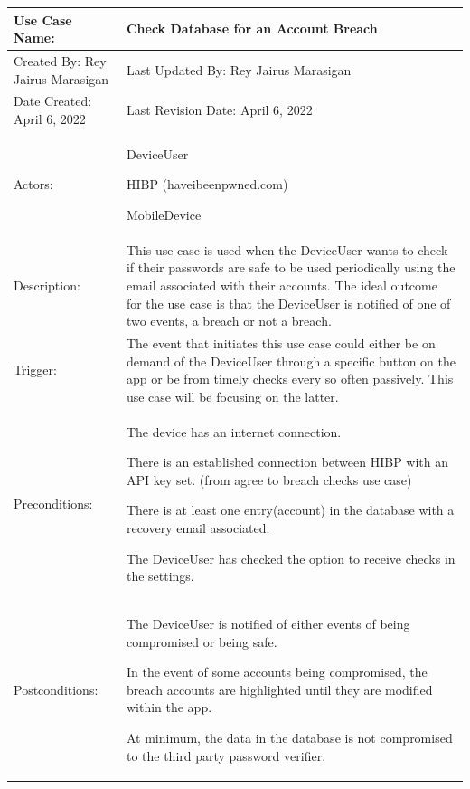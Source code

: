 \documentclass[stu]{apa7}
\newcommand{\nextitem}{\par\hspace*{\labelsep}\textbullet\hspace*{\labelsep}}
\begin{document}
{{{\begin{xltabular}{\textwidth}{|l|X|}
  Use Case Name: & Check Database for an Account Breach\\ \hline

  Created By: Rey Jairus Marasigan & Last Updated By: Rey Jairus Marasigan \\ \hline

  Date Created: April 6, 2022 & Last Revision Date: April 6, 2022 \\ \hline

  Actors: & \nextitem DeviceUser \nextitem HIBP (haveibeenpwned.com) \nextitem MobileDevice \\ \hline

  Description: & This use case is used when the DeviceUser wants to check if their passwords are safe to be used periodically using the email associated with their accounts. The ideal outcome for the use case is that the DeviceUser is notified of one of two events, a breach or not a breach. \\ \hline

  Trigger: & The event that initiates this use case could either be on demand of the DeviceUser through a specific button on the app or be from timely checks every so often passively. This use case will be focusing on the latter. \\ \hline

  Preconditions: & \nextitem The device has an internet connection.
                   \nextitem There is an established connection between HIBP with an API key set. (from agree to breach checks use case)
                   \nextitem There is at least one entry(account) in the database with a recovery email associated.
                   \nextitem The DeviceUser has checked the option to receive checks in the settings. \\ \hline

  Postconditions: & \nextitem The DeviceUser is notified of either events of being compromised or being safe.
                    \nextitem In the event of some accounts being compromised, the breach accounts are highlighted until they are modified within the app.
                    \nextitem At minimum, the data in the database is not compromised to the third party password verifier. \\ \hline


\end{xltabular}}}}
\end{document}
